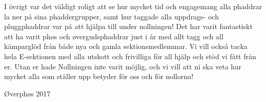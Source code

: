 \documentclass[../_main/handlingar.tex]{subfiles}
\begin{document}
\newpage
I övrigt var det väldigt roligt att se hur mycket tid och engagemang alla phaddrar la ner på sina phaddergrupper, samt hur taggade alla uppdrags- och pluggphaddrar var på att hjälpa till under nollningen! Det har varit fantastiskt att ha varit phøs och øvergudsphaddrar just i år med allt tagg och all kämparglöd från både nya och gamla sektionsmedlemmar. Vi vill också tacka hela E-sektionen med alla utskott och frivilliga för all hjälp och stöd vi fått från er. Utan er hade Nollningen inte varit möjlig, och vi vill att ni ska veta hur mycket alla som ställer upp betyder för oss och för nollorna!
\begin{signatures}{1}
    \mvh
    \signature{Niklas Gustafson}{Øverphøs 2017}
\end{signatures}
\end{document}
